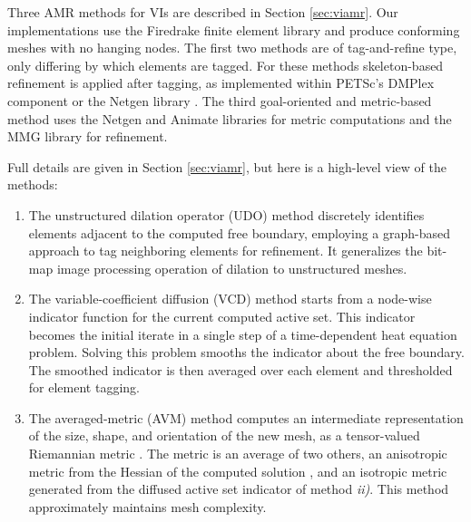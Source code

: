 \documentclass[]{interact}
\theoremstyle{plain}%
\theoremstyle{definition}
\theoremstyle{remark}
\begin{document}
Three AMR methods for VIs are described in Section \ref{sec:viamr}.  Our implementations use the Firedrake finite element library \cite{Rathgeberetal2016} and produce conforming meshes with no hanging nodes.  The first two methods are of tag-and-refine type, only differing by which elements are tagged.  For these methods skeleton-based refinement \cite{PlazaCarey2000} is applied after tagging, as implemented within PETSc's DMPlex component \cite{petsc-user-ref} or the Netgen library \cite{Betteridgeetal2024}.  The third goal-oriented and metric-based method uses the Netgen \cite{Wallworketal2020} and Animate libraries for metric computations and the MMG library \cite{DapognyDobrzynskiFrey2014} for refinement.

Full details are given in Section \ref{sec:viamr}, but here is a high-level view of the methods:

\renewcommand{\labelenumi}{\emph{\roman{enumi})}}
\begin{enumerate}
\item The unstructured dilation operator (UDO) method discretely identifies elements adjacent to the computed free boundary, employing a graph-based approach to tag neighboring elements for refinement.  It generalizes the bit-map image processing operation of dilation \cite{Pratt1991} to unstructured meshes.
\item The variable-coefficient diffusion (VCD) method starts from a node-wise indicator function for the current computed active set.  This indicator becomes the initial iterate in a single step of a time-dependent heat equation problem.  Solving this problem smooths the indicator about the free boundary.  The smoothed indicator is then averaged over each element and thresholded for element tagging.
\item The averaged-metric (AVM) method computes an intermediate representation of the size, shape, and orientation of the new mesh, as a tensor-valued Riemannian metric \cite{Alauzet2010}.  The metric is an average of two others, an anisotropic metric from the Hessian of the computed solution \cite{Wallworketal2020}, and an isotropic metric generated from the diffused active set indicator of method \emph{ii)}.  This method approximately maintains mesh complexity.
\end{enumerate}
\end{document}
